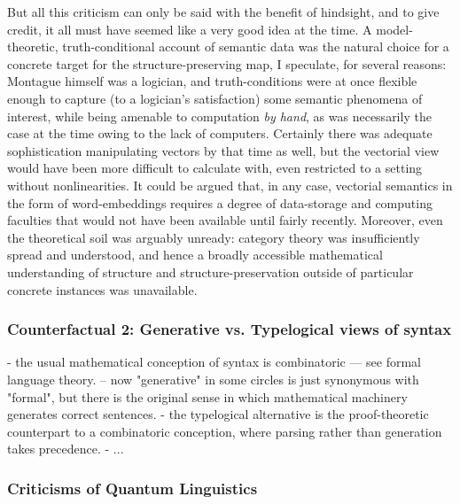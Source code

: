 But all this criticism can only be said with the benefit of hindsight, and to give credit, it all must have seemed like a very good idea at the time. A model-theoretic, truth-conditional account of semantic data was the natural choice for a concrete target for the structure-preserving map, I speculate, for several reasons: Montague himself was a logician, and truth-conditions were at once flexible enough to capture (to a logician's satisfaction) some semantic phenomena of interest, while being amenable to computation \emph{by hand}, as was necessarily the case at the time owing to the lack of computers. Certainly there was adequate sophistication manipulating vectors by that time as well, but the vectorial view would have been more difficult to calculate with, even restricted to a setting without nonlinearities. It could be argued that, in any case, vectorial semantics in the form of word-embeddings requires a degree of data-storage and computing faculties that would not have been available until fairly recently. Moreover, even the theoretical soil was arguably unready: category theory was insufficiently spread and understood, and hence a broadly accessible mathematical understanding of structure and structure-preservation outside of particular concrete instances was unavailable.

\subsubsection{Counterfactual 2: Generative vs. Typelogical views of syntax}

- the usual mathematical conception of syntax is combinatoric --- see formal language theory.
-- now "generative" in some circles is just synonymous with "formal", but there is the original sense in which mathematical machinery generates correct sentences.
- the typelogical alternative is the proof-theoretic counterpart to a combinatoric conception, where parsing rather than generation takes precedence.
- ...

\subsubsection{Criticisms of Quantum Linguistics}

